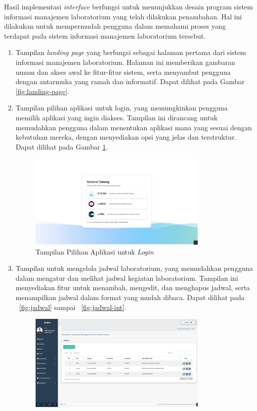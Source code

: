 Hasil implementasi \textit{interface} berfungsi untuk menunjukkan desain program sistem informasi manajemen laboratorium yang telah dilakukan penambahan. Hal ini dilakukan untuk mempermudah pengguna dalam memahami proses yang terdapat pada sistem informasi manajemen laboratorium tersebut.

\begin{enumerate}
	\item Tampilan \textit{landing page} yang berfungsi sebagai halaman pertama dari sistem informasi manajemen laboratorium. Halaman ini memberikan gambaran umum dan akses awal ke fitur-fitur sistem, serta menyambut pengguna dengan antarmuka yang ramah dan informatif. Dapat dilihat pada Gambar \ref{fig:landing-page}.

	\item Tampilan pilihan aplikasi untuk login, yang memungkinkan pengguna memilih aplikasi yang ingin diakses. Tampilan ini dirancang untuk memudahkan pengguna dalam menentukan aplikasi mana yang sesuai dengan kebutuhan mereka, dengan menyediakan opsi yang jelas dan terstruktur. Dapat dilihat pada Gambar \ref{fig:pilih-login}.
	      \begin{figure}
		      \centering
		      \includegraphics[width=0.82\textwidth]{konten/gambar/hasil/pilih-aplikasi.jpeg}
		      \caption{Tampilan Pilihan Aplikasi untuk \textit{Login}}
		      \label{fig:pilih-login}
	      \end{figure}
	\item Tampilan untuk mengelola jadwal laboratorium, yang memudahkan pengguna dalam mengatur dan melihat jadwal kegiatan laboratorium. Tampilan ini menyediakan fitur untuk menambah, mengedit, dan menghapus jadwal, serta menampilkan jadwal dalam format yang mudah dibaca. Dapat dilihat pada \pic~\ref{fig:jadwal} sampai \pic~\ref{fig:jadwal-int}.
	      \begin{figure}
		      \centering
		      \includegraphics[width=0.82\textwidth]{konten/gambar/hasil/jadwal.jpeg}

\end{figure}
\end{enumerate}
